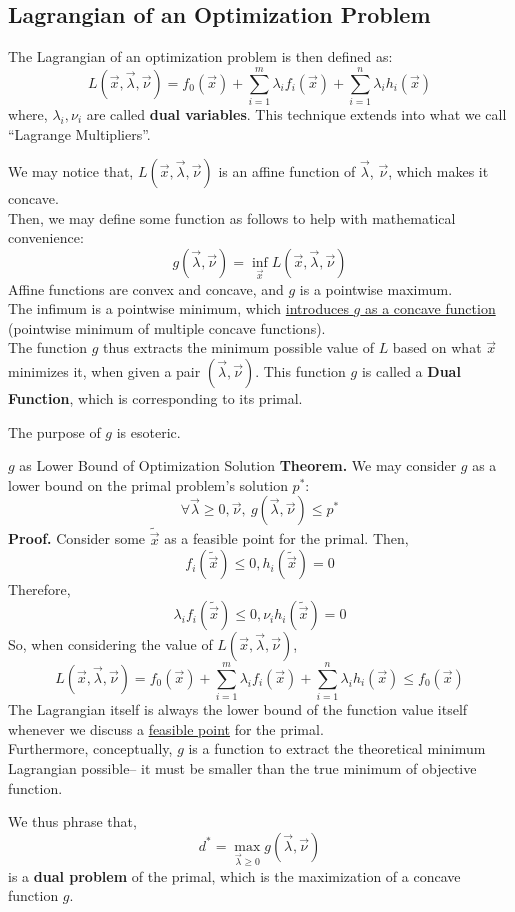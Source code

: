 \subsection{Lagrangian of an Optimization Problem}
The Lagrangian of an optimization problem is then defined as:
\[
    L(\vec{x}, \vec{\lambda}, \vec{\nu}) = f_0 (\vec{x}) + \sum_{i = 1}^m \lambda_i f_i (\vec{x}) + \sum_{i = 1}^n \lambda_i h_i (\vec{x})
\]
where, $\lambda_i, \nu_i$ are called \textbf{dual variables}. This technique extends into what we call ``Lagrange Multipliers''.

We may notice that, $L(\vec{x}, \vec{\lambda}, \vec{\nu})$ is an affine function of $\vec{\lambda}$, $\vec{\nu}$, which makes it concave. \\
Then, we may define some function as follows to help with mathematical convenience:
\[
    g(\vec{\lambda}, \vec{\nu}) = \inf_{\vec{x}} L(\vec{x}, \vec{\lambda}, \vec{\nu})
\]
Affine functions are convex and concave, and $g$ is a pointwise maximum. \\
The infimum is a pointwise minimum, which \underline{introduces $g$ as a concave function} (pointwise minimum of multiple concave functions). \\
The function $g$ thus extracts the minimum possible value of $L$ based on what $\vec{x}$ minimizes it, when given a pair $(\vec{\lambda}, \vec{\nu})$.
This function $g$ is called a \textbf{Dual Function}, which is corresponding to its primal.

The purpose of $g$ is esoteric.
\begin{ln-theorem}{$g$ as Lower Bound of Optimization Solution}{}
    \textbf{Theorem.} We may consider $g$ as a lower bound on the primal problem's solution $p^*$:
    \[
        \forall \vec{\lambda} \geq 0, \vec{\nu},\ g(\vec{\lambda}, \vec{\nu}) \leq p^*
    \]
    \tcblower
    \textbf{Proof.}
    Consider some $\tilde{\vec{x}}$ as a feasible point for the primal.
    Then,
    \[
        f_i (\tilde{\vec{x}}) \leq 0, h_i (\tilde{\vec{x}}) = 0
    \]
    Therefore,
    \[
        \lambda_i f_i (\tilde{\vec{x}}) \leq 0, \nu_i h_i (\tilde{\vec{x}}) = 0
    \]
    So, when considering the value of $L(\vec{x}, \vec{\lambda}, \vec{\nu})$,
    \[
        L(\vec{x}, \vec{\lambda}, \vec{\nu}) = f_0 (\vec{x}) + \sum_{i = 1}^m \lambda_i f_i (\vec{x}) + \sum_{i = 1}^n \lambda_i h_i (\vec{x}) \leq f_0 (\vec{x})
    \]
    The Lagrangian itself is always the lower bound of the function value itself whenever we discuss a \underline{feasible point} for the primal. \\
    Furthermore, conceptually, $g$ is a function to extract the theoretical minimum Lagrangian possible-- it must be smaller than the true minimum of objective function.
\end{ln-theorem}

We thus phrase that,
\[
    d^* = \max_{\vec{\lambda} \geq 0} g(\vec{\lambda}, \vec{\nu})
\]
is a \textbf{dual problem} of the primal, which is the maximization of a concave function $g$.
